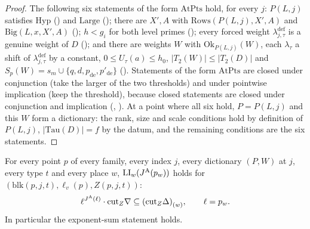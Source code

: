 \begin{proof}
The following six statements of the form $\mathrm{AtPts}$ hold, for every $j$: $P(L,j)$ satisfies $\mathrm{Hyp}$
() and $\mathrm{Large}$ (); there are
$X',A$ with $\mathrm{Rows}(P(L,j),X',A)$ and $\mathrm{Big}(L,x,X',A)$ ();
$h<g_i$ for both level primes (); every forced weight $\lambda^{\mathrm{def}}_{j,\tau}$
is a genuine weight of $D$ (); and there are weights $W$ with $\mathrm{Ok}_{P(L,j)}(W)$, each
$\lambda_\tau$ a shift of $\lambda^{\mathrm{def}}_{j,\tau}$ by a constant, $0\le U_\tau(a)\le h_0$, $|T_2(W)|\le|T_2(D)|$ and
$S_p(W)=s_m\cup\{q,d,p_{\mathrm{de}},p'_{\mathrm{de}}\}$ (). Statements of the form
$\mathrm{AtPts}$ are closed under conjunction (take the larger of the two thresholds) and under pointwise implication (keep the
threshold), because closed statements are closed under conjunction and implication (,
). At a point where all six hold, $P=P(L,j)$ and this $W$ form a dictionary: the rank, size and
scale conditions hold by definition of $P(L,j)$, $|\mathrm{Tau}(D)|=f$ by the datum, and the remaining conditions are the six statements.
\end{proof}

\begin{proposition}\label{pf:onto2:sumexp}
For every point $p$ of every family, every index $j$, every dictionary $(P,W)$ at $j$, every type $t$ and every place $w$,
$\ontoIILI_w(\ontoIIJA(p_w))$ holds for $(\mathrm{blk}(p,j,t),\ell_v(p),Z(p,j,t))$:
\[
\ell^{\ontoIIJA(\ell)}\cdot\mathrm{cut}_Z\nabla\subseteq\ontoIIloc w{(\mathrm{cut}_Z\Delta)},\qquad \ell=p_w .
\]
In particular the exponent-sum statement holds.
\end{proposition}

